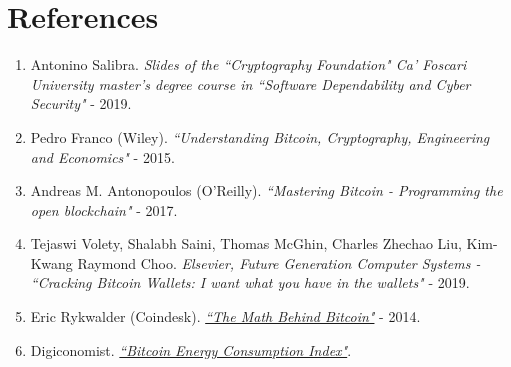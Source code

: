 \documentclass{article}
\begin{document}
\shipout\null

\section*{References}
\begin{enumerate}
    \item Antonino Salibra. \textit{Slides of the ``Cryptography Foundation" Ca' Foscari University master's degree course in ``Software Dependability and Cyber Security"} - 2019.
    \item Pedro Franco (Wiley). \textit{``Understanding Bitcoin, Cryptography, Engineering and Economics"} - 2015.
    \item Andreas M. Antonopoulos (O’Reilly). \textit{``Mastering Bitcoin - Programming the open blockchain"} - 2017.
    \item Tejaswi Volety, Shalabh Saini, Thomas McGhin, Charles Zhechao Liu, Kim-Kwang Raymond Choo. \textit{Elsevier, Future Generation Computer Systems - ``Cracking Bitcoin Wallets: I want what you have in the wallets"} - 2019.
    \item Eric Rykwalder (Coindesk). \textit{\href{https://www.coindesk.com/math-behind-bitcoin}{``The Math Behind Bitcoin"}} - 2014.
    \item Digiconomist. \textit{\href{https://digiconomist.net/bitcoin-energy-consumption}{``Bitcoin Energy Consumption Index"}}.
\end{enumerate}
\clearpage

\listoffigures
\end{document}
